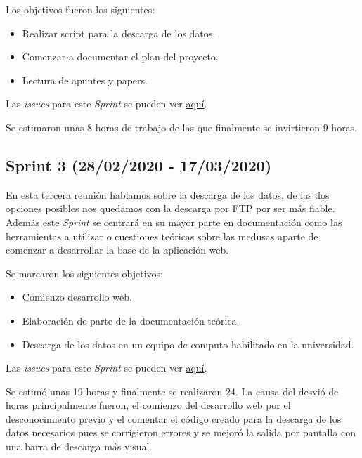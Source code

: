 Los objetivos fueron los siguientes:

\begin{itemize}
\item Realizar script para la descarga de los datos.
\item Comenzar a documentar el plan del proyecto.
\item Lectura de apuntes y papers.
\end{itemize}

Las \emph{issues} para este \emph{Sprint} se pueden ver \href{https://github.com/psnti/TFG-Pablo-Santidrian-Tudanca/milestone/2}{aquí}.

Se estimaron unas 8 horas de trabajo de las que finalmente se invirtieron 9 horas.


\subsection{Sprint 3 (28/02/2020 - 17/03/2020)}\label{Sprint-3}

En esta tercera reunión hablamos sobre la descarga de los datos, de las dos opciones posibles nos quedamos con la descarga por FTP por ser más fiable. Además este \emph{Sprint} se centrará en su mayor parte en documentación como las herramientas a utilizar o cuestiones teóricas sobre las medusas aparte de comenzar a desarrollar la base de la aplicación web.

Se marcaron los siguientes objetivos:
\begin{itemize}
\item Comienzo desarrollo web.
\item Elaboración de parte de la documentación teórica.
\item Descarga de los datos en un equipo de computo habilitado en la universidad.
\end{itemize}

Las \emph{issues} para este \emph{Sprint} se pueden ver \href{https://github.com/psnti/TFG-Pablo-Santidrian-Tudanca/milestone/3}{aquí}.

Se estimó unas 19 horas y finalmente se realizaron 24. La causa del desvió de horas principalmente fueron, el comienzo del desarrollo web por el desconocimiento previo y el comentar el código creado para la descarga de los datos necesarios pues se corrigieron errores y se mejoró la salida por pantalla con una barra de descarga más visual.


